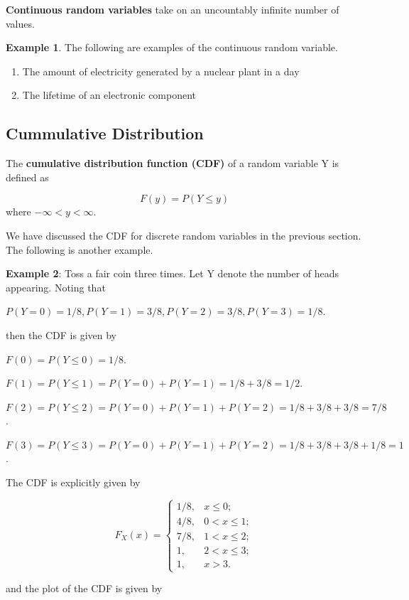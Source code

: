 \documentclass[
]{book}
\begin{document}
\textbf{Continuous random variables} take on an uncountably infinite number of values.

\textbf{Example 1}. The following are examples of the continuous random variable.

\begin{enumerate}
\def\labelenumi{\arabic{enumi}.}
\item
  The amount of electricity generated by a nuclear plant in a day
\item
  The lifetime of an electronic component
\end{enumerate}

\hypertarget{cummulative-distribution}{%
\subsection{Cummulative Distribution}\label{cummulative-distribution}}

The \textbf{cumulative distribution function (CDF)} of a random variable Y is defined as

\[
 F(y) = P(Y \le y)
 \]
where \(- \infty < y < \infty\).

We have discussed the CDF for discrete random variables in the previous section. The following is another example.

\textbf{Example 2}: Toss a fair coin three times. Let Y denote the number of heads appearing. Noting that

\(P(Y=0) = 1/8, P(Y=1) = 3/8, P(Y =2) = 3/8, P(Y=3) = 1/8.\)

then the CDF is given by

\(F(0) = P(Y \le 0) = 1/8\).

\(F(1) = P(Y \le 1) = P(Y=0) +P(Y=1) = 1/8 + 3/8 = 1/2\).

\(F(2) = P(Y \le 2) = P(Y=0) +P(Y=1) + P(Y =2) = 1/8 + 3/8 + 3/8 = 7/8\).

\(F(3) = P(Y \le 3) = P(Y=0) +P(Y=1) + P(Y =2) = 1/8 + 3/8 + 3/8 + 1/8 = 1\).

The CDF is explicitly given by

\[
\displaystyle F_X(x) = \begin{cases} 
 1/8,  & x \le 0 ;   \\  
 4/8,  & 0 < x \le 1;  \\
 7/8,  & 1 < x \le 2 ; \\
 1,    & 2 < x \le 3;  \\
 1,    & x > 3.
 \end{cases}
\]

and the plot of the CDF is given by
\end{document}
